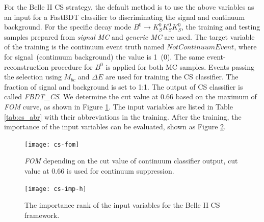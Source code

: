 For the Belle II CS strategy, the default method is to use the above variables as an input for a FastBDT classifier to discriminating the signal and continuum background. For the specific decay mode $B^0 \to K_S^0  K_S^0  K_S^0$, the training and testing samples prepared from \textit{signal MC} and \textit{generic MC} are used. The target variable of the training is the continuum event truth named $NotContinuumEvent$, where for signal~(continuum background) the value is 1~(0).  The same event-reconstruction procedure for $B^0$ is applied for both MC samples. Events passing the selection using $M_{bc}$ and $\Delta E$ are used for training the CS classifier. The fraction of signal and background is set to 1:1. The output of CS classifier is called \textit{FBDT\_CS}.  We determine the cut value at 0.66 based on the maximum of \textit{FOM} curve, as shown in Figure \ref{fig:cs_fom}. The input variables are listed in Table \ref{tab:cs_abr} with their abbreviations in the training. After the training, the importance of the input variables can be evaluated, shown as Figure \ref{tab:cs_imp-h}.

\begin{figure}[htpb]
	\centering
	\texttt{[image: cs-fom]}
	\caption{\textit{FOM} depending on the cut value of continuum classifier output, cut value at 0.66 is used for continuum suppression. }
	\label{fig:cs_fom}
\end{figure}

\begin{figure}[htpb]
	\centering 
	\caption{The importance rank of the input variables for the Belle II CS framework.}
	\label{tab:cs_imp-h}
	\texttt{[image: cs-imp-h]}
\end{figure}

